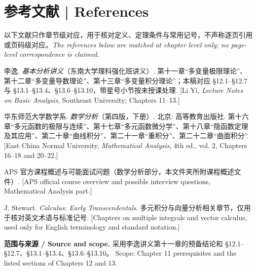 \documentclass[UTF8,11pt,a4paper]{ctexart}
\begin{document}
\section*{参考文献 | References}
\noindent 以下文献只作章节级对应，用于核对定义、定理条件与常用记号，不声称逐页引用或页码级对应。\textit{The references below are matched at chapter level only; no page-level correspondence is claimed.}
\begin{enumerate}[label={[\arabic*]},leftmargin=2.4em]
\item 李逸. \textit{基本分析讲义}（东南大学理科强化班讲义）. 第十一章“多变量极限理论”、第十二章“多变量导数理论”、第十三章“多变量积分理论”；本稿对应 §12.1--§12.7 与 §13.1--§13.4、§13.6--§13.10，带星号小节按未授课处理. [Li Yi, \textit{Lecture Notes on Basic Analysis}, Southeast University; Chapters 11--13.]
\item 华东师范大学数学系. \textit{数学分析}（第四版，下册）. 北京: 高等教育出版社. 第十六章“多元函数的极限与连续”、第十七章“多元函数微分学”、第十八章“隐函数定理及其应用”、第二十章“曲线积分”、第二十一章“重积分”、第二十二章“曲面积分”. [East China Normal University, \textit{Mathematical Analysis}, 4th ed., vol. 2, Chapters 16--18 and 20--22.]
\item APS 官方课程概述与可能面试问题（数学分析部分，本文件夹所附课程概述文件）. [APS official course overview and possible interview questions, Mathematical Analysis part.]
\item J. Stewart. \textit{Calculus: Early Transcendentals}. 多元积分与向量分析相关章节，仅用于核对英文术语与标准记号. [Chapters on multiple integrals and vector calculus, used only for English terminology and standard notation.]
\end{enumerate}

{\footnotesize\noindent\textbf{范围与来源 / Source and scope.} 采用李逸讲义第十一章的预备结论和 §12.1--§12.7、§13.1--§13.4、§13.6--§13.10。 Scope: Chapter 11 prerequisites and the listed sections of Chapters 12 and 13.\par}
\end{document}
